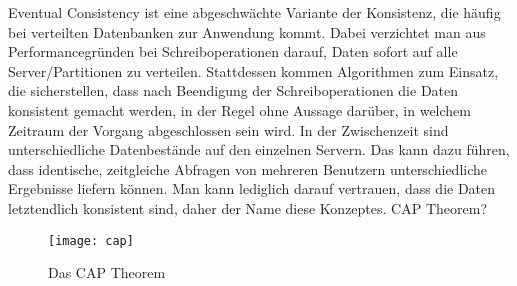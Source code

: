  Eventual Consistency ist eine abgeschwächte Variante der Konsistenz, die häufig bei verteilten Datenbanken zur Anwendung kommt. Dabei verzichtet man aus Performancegründen bei Schreiboperationen darauf, Daten sofort auf alle Server/Partitionen zu verteilen.
Stattdessen kommen Algorithmen zum Einsatz, die sicherstellen, dass nach Beendigung der Schreiboperationen die Daten konsistent gemacht werden, in der Regel ohne Aussage darüber, in welchem Zeitraum der Vorgang abgeschlossen sein wird. In der Zwischenzeit sind unterschiedliche Datenbestände auf den einzelnen Servern. Das kann dazu führen, dass identische, zeitgleiche Abfragen von mehreren Benutzern unterschiedliche Ergebnisse liefern können. Man kann lediglich darauf vertrauen, dass die Daten letztendlich konsistent sind, daher der Name diese Konzeptes.
\gls{CAP} Theorem?
\begin{figure}[H]
  \centering
  \texttt{[image: cap]}
  \grayRule
  \caption{Das CAP Theorem}
  \label{fig:cap}
\end{figure}